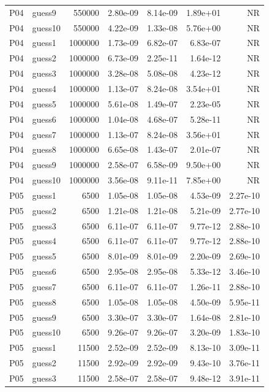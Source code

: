 {\begin{longtable}{llrrrrr}
P04 & guess9 & 550000 & 2.80e-09 & 8.14e-09 & 1.89e+01 & NR \\
P04 & guess10 & 550000 & 4.22e-09 & 1.33e-08 & 5.76e+00 & NR \\
P04 & guess1 & 1000000 & 1.73e-09 & 6.82e-07 & 6.83e-07 & NR \\
P04 & guess2 & 1000000 & 6.73e-09 & 2.25e-11 & 1.64e-12 & NR \\
P04 & guess3 & 1000000 & 3.28e-08 & 5.08e-08 & 4.23e-12 & NR \\
P04 & guess4 & 1000000 & 1.13e-07 & 8.24e-08 & 3.54e+01 & NR \\
P04 & guess5 & 1000000 & 5.61e-08 & 1.49e-07 & 2.23e-05 & NR \\
P04 & guess6 & 1000000 & 1.04e-08 & 4.68e-07 & 5.28e-11 & NR \\
P04 & guess7 & 1000000 & 1.13e-07 & 8.24e-08 & 3.56e+01 & NR \\
P04 & guess8 & 1000000 & 6.65e-08 & 1.43e-07 & 2.01e-07 & NR \\
P04 & guess9 & 1000000 & 2.58e-07 & 6.58e-09 & 9.50e+00 & NR \\
P04 & guess10 & 1000000 & 3.56e-08 & 9.11e-11 & 7.85e+00 & NR \\
P05 & guess1 & 6500 & 1.05e-08 & 1.05e-08 & 4.53e-09 & 2.27e-10 \\
P05 & guess2 & 6500 & 1.21e-08 & 1.21e-08 & 5.21e-09 & 2.77e-10 \\
P05 & guess3 & 6500 & 6.11e-07 & 6.11e-07 & 9.77e-12 & 2.88e-10 \\
P05 & guess4 & 6500 & 6.11e-07 & 6.11e-07 & 9.77e-12 & 2.88e-10 \\
P05 & guess5 & 6500 & 8.01e-09 & 8.01e-09 & 2.20e-09 & 2.69e-10 \\
P05 & guess6 & 6500 & 2.95e-08 & 2.95e-08 & 5.33e-12 & 3.46e-10 \\
P05 & guess7 & 6500 & 6.11e-07 & 6.11e-07 & 1.26e-11 & 2.88e-10 \\
P05 & guess8 & 6500 & 1.05e-08 & 1.05e-08 & 4.50e-09 & 5.95e-11 \\
P05 & guess9 & 6500 & 3.30e-07 & 3.30e-07 & 1.64e-08 & 2.81e-10 \\
P05 & guess10 & 6500 & 9.26e-07 & 9.26e-07 & 3.20e-09 & 1.83e-10 \\
P05 & guess1 & 11500 & 2.52e-09 & 2.52e-09 & 8.13e-10 & 3.09e-11 \\
P05 & guess2 & 11500 & 2.92e-09 & 2.92e-09 & 9.43e-10 & 3.76e-11 \\
P05 & guess3 & 11500 & 2.58e-07 & 2.58e-07 & 9.48e-12 & 3.91e-11 \\

\end{longtable}}
